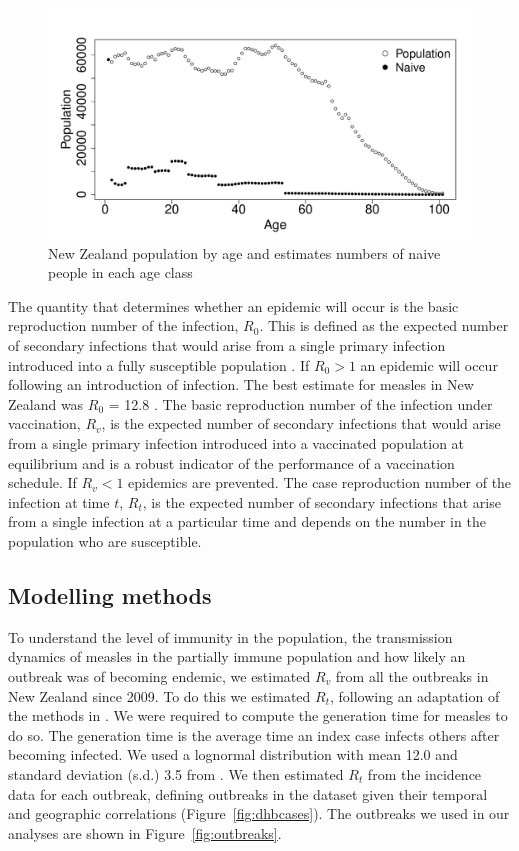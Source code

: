 \documentclass{article}
\begin{document}
\begin{figure}[h!]
\begin{center}
\includegraphics{interimreport2-020}
\end{center}
\caption{New Zealand population by age and estimates numbers of naive people in each age class}
\label{fig:naive}
\end{figure}

The quantity that determines whether an epidemic will occur is the basic reproduction number of the infection, $R_0$. This is defined as the expected number of secondary infections that would arise from a single primary infection introduced into a fully susceptible population \citep{anderson91, diekmann0}. If $R_0 > 1$ an epidemic will occur following an introduction of infection. The best estimate for measles in New Zealand was $R_0$ = 12.8 \citep{roberts4}. The basic reproduction number of the infection under vaccination, $R_v$, is the expected number of secondary infections that would arise from a single primary infection introduced into a vaccinated population at equilibrium and is a robust indicator of the performance of a vaccination schedule. If $R_v < 1$ epidemics are prevented. The case reproduction number of the infection at time $t$, $R_t$, is the expected number of secondary infections that arise from a single infection at a particular time and depends on the number in the population who are susceptible.

\subsection{Modelling methods}

To understand the level of immunity in the population, the transmission dynamics of measles in the partially immune population and how likely an outbreak was of becoming endemic, we estimated $R_v$ from all the outbreaks in New Zealand since 2009. To do this we estimated $R_t$, following an adaptation of the methods in \citep{obidia12,wallinga4}. We were required to compute the generation time for measles to do so. The generation time is the average time an index case infects others after becoming infected. We used a lognormal distribution with mean 12.0 and standard deviation (s.d.) 3.5 from \citep{klinkenberg11}. We then estimated $R_t$ from the incidence data for each outbreak, defining outbreaks in the dataset given their temporal and geographic correlations (Figure~\ref{fig:dhbcases}). The outbreaks we used in our analyses are shown in Figure~\ref{fig:outbreaks}.
\end{document}
